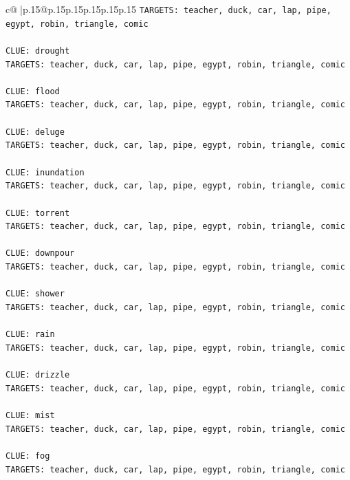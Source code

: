 \documentclass{article}
\begin{document}
{\begin{supertabular}{c@{$\;$}|p{.15\linewidth}@{}p{.15\linewidth}p{.15\linewidth}p{.15\linewidth}p{.15\linewidth}p{.15\linewidth}}
{{{\texttt{TARGETS: teacher, duck, car, lap, pipe, egypt, robin, triangle, comic} \\
\\ 
\texttt{CLUE: drought} \\
\texttt{TARGETS: teacher, duck, car, lap, pipe, egypt, robin, triangle, comic} \\
\\ 
\texttt{CLUE: flood} \\
\texttt{TARGETS: teacher, duck, car, lap, pipe, egypt, robin, triangle, comic} \\
\\ 
\texttt{CLUE: deluge} \\
\texttt{TARGETS: teacher, duck, car, lap, pipe, egypt, robin, triangle, comic} \\
\\ 
\texttt{CLUE: inundation} \\
\texttt{TARGETS: teacher, duck, car, lap, pipe, egypt, robin, triangle, comic} \\
\\ 
\texttt{CLUE: torrent} \\
\texttt{TARGETS: teacher, duck, car, lap, pipe, egypt, robin, triangle, comic} \\
\\ 
\texttt{CLUE: downpour} \\
\texttt{TARGETS: teacher, duck, car, lap, pipe, egypt, robin, triangle, comic} \\
\\ 
\texttt{CLUE: shower} \\
\texttt{TARGETS: teacher, duck, car, lap, pipe, egypt, robin, triangle, comic} \\
\\ 
\texttt{CLUE: rain} \\
\texttt{TARGETS: teacher, duck, car, lap, pipe, egypt, robin, triangle, comic} \\
\\ 
\texttt{CLUE: drizzle} \\
\texttt{TARGETS: teacher, duck, car, lap, pipe, egypt, robin, triangle, comic} \\
\\ 
\texttt{CLUE: mist} \\
\texttt{TARGETS: teacher, duck, car, lap, pipe, egypt, robin, triangle, comic} \\
\\ 
\texttt{CLUE: fog} \\
\texttt{TARGETS: teacher, duck, car, lap, pipe, egypt, robin, triangle, comic} \\
}}}
\end{supertabular}}
\end{document}
